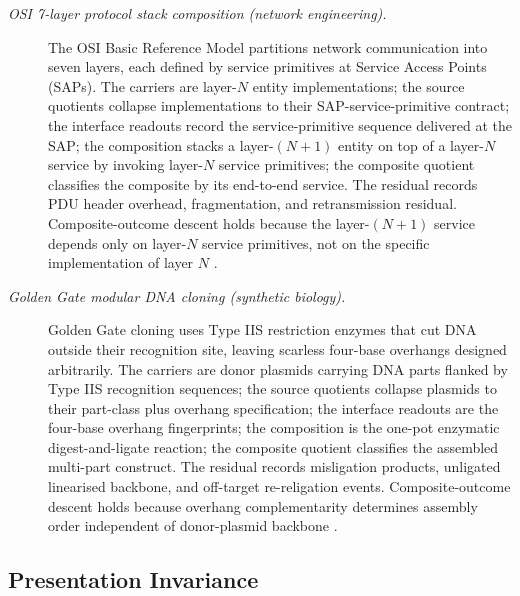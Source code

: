 \documentclass[11pt]{article}
\theoremstyle{definition}
\begin{document}
\begin{description}
\item[\emph{{OSI} 7-layer protocol stack composition
(network engineering).}]
The OSI Basic Reference Model partitions network
communication into seven layers, each defined by
service primitives at Service Access Points (SAPs).
The carriers are layer-\(N\) entity implementations;
the source quotients collapse implementations to their
SAP-service-primitive contract; the interface readouts
record the service-primitive sequence delivered at the
SAP; the composition stacks a layer-\((N{+}1)\) entity
on top of a layer-\(N\) service by invoking layer-\(N\)
service primitives; the composite quotient classifies
the composite by its end-to-end service.  The residual
records PDU header overhead, fragmentation, and
retransmission residual.  Composite-outcome descent
holds because the layer-\((N{+}1)\) service depends
only on layer-\(N\) service primitives, not on the
specific implementation of layer \(N\)
\citep{ISOIEC7498OSI}.

\item[\emph{Golden Gate modular {DNA} cloning
(synthetic biology).}]
Golden Gate cloning uses Type IIS restriction enzymes
that cut DNA outside their recognition site, leaving
scarless four-base overhangs designed arbitrarily.
The carriers are donor plasmids carrying DNA parts
flanked by Type IIS recognition sequences; the source
quotients collapse plasmids to their part-class plus
overhang specification; the interface readouts are the
four-base overhang fingerprints; the composition is the
one-pot enzymatic digest-and-ligate reaction; the
composite quotient classifies the assembled multi-part
construct.  The residual records misligation products,
unligated linearised backbone, and off-target
re-religation events.  Composite-outcome descent holds
because overhang complementarity determines assembly
order independent of donor-plasmid backbone
\citep{Engler2008GoldenGate}.
\end{description}

\subsection{Presentation Invariance}\label{sec:status-records-coherence:presentation-invariance}
\end{document}
